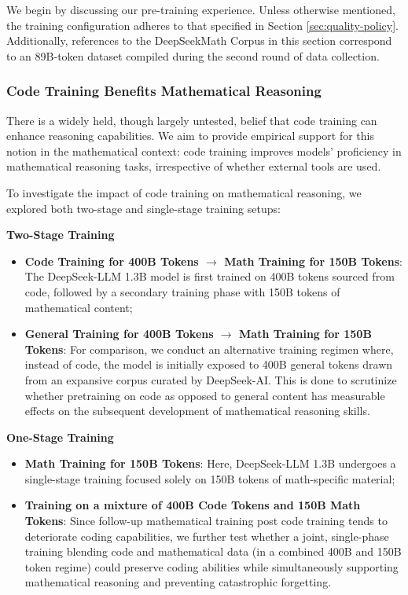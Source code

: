 We begin by discussing our pre-training experience. Unless otherwise mentioned, the training configuration adheres to that specified in Section \ref{sec:quality-policy}. Additionally, references to the DeepSeekMath Corpus in this section correspond to an 89B-token dataset compiled during the second round of data collection.

\subsubsection{Code Training Benefits Mathematical Reasoning}

There is a widely held, though largely untested, belief that code training can enhance reasoning capabilities. We aim to provide empirical support for this notion in the mathematical context: code training improves models’ proficiency in mathematical reasoning tasks, irrespective of whether external tools are used.

To investigate the impact of code training on mathematical reasoning, we explored both two-stage and single-stage training setups:

\textbf{Two-Stage Training}

\begin{itemize}[topsep=0pt]
    \item \textbf{Code Training for 400B Tokens $\rightarrow$ Math Training for 150B Tokens}: The DeepSeek-LLM 1.3B model is first trained on 400B tokens sourced from code, followed by a secondary training phase with 150B tokens of mathematical content;
    \item \textbf{General Training for 400B Tokens $\rightarrow$ Math Training for 150B Tokens}: For comparison, we conduct an alternative training regimen where, instead of code, the model is initially exposed to 400B general tokens drawn from an expansive corpus curated by DeepSeek-AI. This is done to scrutinize whether pretraining on code as opposed to general content has measurable effects on the subsequent development of mathematical reasoning skills.
\end{itemize}

\textbf{One-Stage Training}

\begin{itemize}[topsep=0pt]
    \item \textbf{Math Training for 150B Tokens}: Here, DeepSeek-LLM 1.3B undergoes a single-stage training focused solely on 150B tokens of math-specific material;
    \item \textbf{Training on a mixture of 400B Code Tokens and 150B Math Tokens}: Since follow-up mathematical training post code training tends to deteriorate coding capabilities, we further test whether a joint, single-phase training blending code and mathematical data (in a combined 400B and 150B token regime) could preserve coding abilities while simultaneously supporting mathematical reasoning and preventing catastrophic forgetting.
\end{itemize}

